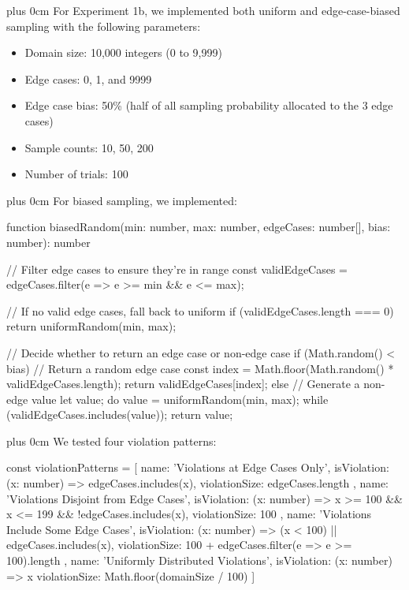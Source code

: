 \documentclass[conference]{IEEEtran}
\newcommand{\justifytext}{\leftskip=0pt \rightskip=0pt plus 0cm}
\begin{document}
\justifytext
For Experiment 1b, we implemented both uniform and edge-case-biased sampling with the following parameters:

\begin{itemize}
\item Domain size: 10,000 integers (0 to 9,999)
\item Edge cases: 0, 1, and 9999
\item Edge case bias: 50\% (half of all sampling probability allocated to the 3 edge cases)
\item Sample counts: 10, 50, 200
\item Number of trials: 100
\end{itemize}

\justifytext
For biased sampling, we implemented:

\begin{wrappedcode}
function biasedRandom(min: number, max: number, edgeCases: number[], bias: number): number {
  // Filter edge cases to ensure they're in range
  const validEdgeCases = edgeCases.filter(e => e >= min && e <= max);
  
  // If no valid edge cases, fall back to uniform
  if (validEdgeCases.length === 0) {
    return uniformRandom(min, max);
  }
  
  // Decide whether to return an edge case or non-edge case
  if (Math.random() < bias) {
    // Return a random edge case
    const index = Math.floor(Math.random() * validEdgeCases.length);
    return validEdgeCases[index];
  } else {
    // Generate a non-edge value
    let value;
    do {
      value = uniformRandom(min, max);
    } while (validEdgeCases.includes(value));
    return value;
  }
}
\end{wrappedcode}

\justifytext
We tested four violation patterns:

\begin{wrappedcode}
const violationPatterns = [
  { 
    name: 'Violations at Edge Cases Only',
    isViolation: (x: number) => edgeCases.includes(x),
    violationSize: edgeCases.length
  },
  { 
    name: 'Violations Disjoint from Edge Cases',
    isViolation: (x: number) => x >= 100 && x <= 199 && !edgeCases.includes(x),
    violationSize: 100
  },
  { 
    name: 'Violations Include Some Edge Cases',
    isViolation: (x: number) => (x < 100) || edgeCases.includes(x),
    violationSize: 100 + edgeCases.filter(e => e >= 100).length
  },
  { 
    name: 'Uniformly Distributed Violations',
    isViolation: (x: number) => x %
    violationSize: Math.floor(domainSize / 100)
  }
]
\end{wrappedcode}
\end{document}
